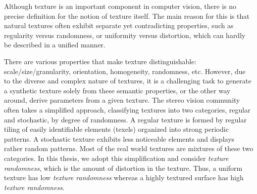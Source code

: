 Although texture is an important component in computer vision, there is no precise definition for the notion of texture itself. The main reason for this is that natural textures often exhibit separate yet contradicting properties, such as regularity versus randomness, or uniformity versus distortion, which can hardly be described in a unified manner. 


There are various properties that make texture distinguishable: scale/size/granularity, orientation, homogeneity, randomness, etc. However, due to the diverse and complex nature of textures, it is a challenging task to generate a synthetic texture solely from these semantic properties, or the other way around, derive parameters from a given texture. The stereo vision community often takes a simplified approach, classifying textures into two categories, regular and stochastic, by degree of randomness. A regular texture is formed by regular tiling of easily identifiable elements (texels) organized into strong periodic patterns. A stochastic texture exhibits less noticeable elements and displays rather random patterns. Most of the real world textures are mixtures of these two categories. In this thesis, we adopt this simplification and consider \textit{texture randomness}, which is the amount of distortion in the texture. Thus, a uniform texture has low \textit{texture randomness} whereas a highly textured surface has high \textit{texture randomness}.

